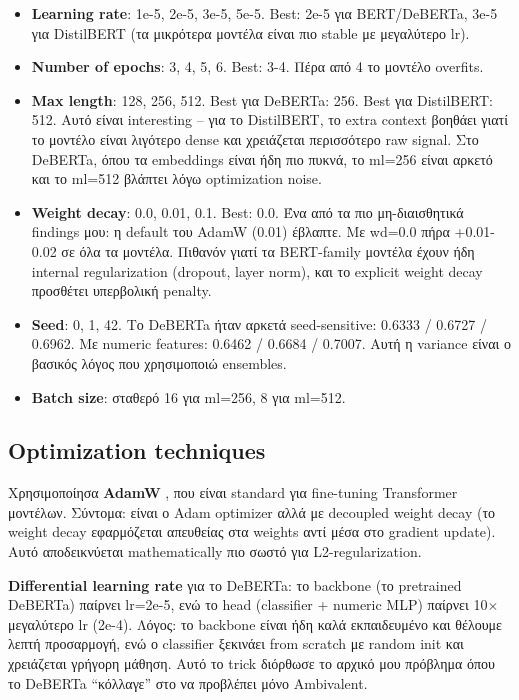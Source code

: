 \documentclass[12pt]{fphw}
\begin{document}
\begin{itemize}
    \item \textbf{Learning rate}: 1e-5, 2e-5, 3e-5, 5e-5. Best: 2e-5 για BERT/DeBERTa, 3e-5 για DistilBERT (τα μικρότερα μοντέλα είναι πιο stable με μεγαλύτερο lr).
    \item \textbf{Number of epochs}: 3, 4, 5, 6. Best: 3-4. Πέρα από 4 το μοντέλο overfits.
    \item \textbf{Max length}: 128, 256, 512. Best για DeBERTa: 256. Best για DistilBERT: 512. Αυτό είναι interesting -- για το DistilBERT, το extra context βοηθάει γιατί το μοντέλο είναι λιγότερο dense και χρειάζεται περισσότερο raw signal. Στο DeBERTa, όπου τα embeddings είναι ήδη πιο πυκνά, το ml=256 είναι αρκετό και το ml=512 βλάπτει λόγω optimization noise.
    \item \textbf{Weight decay}: 0.0, 0.01, 0.1. Best: 0.0. Ένα από τα πιο μη-διαισθητικά findings μου: η default του AdamW (0.01) έβλαπτε. Με wd=0.0 πήρα +0.01-0.02 σε όλα τα μοντέλα. Πιθανόν γιατί τα BERT-family μοντέλα έχουν ήδη internal regularization (dropout, layer norm), και το explicit weight decay προσθέτει υπερβολική penalty.
    \item \textbf{Seed}: 0, 1, 42. Το DeBERTa ήταν αρκετά seed-sensitive: 0.6333 / 0.6727 / 0.6962. Με numeric features: 0.6462 / 0.6684 / 0.7007. Αυτή η variance είναι ο βασικός λόγος που χρησιμοποιώ ensembles.
    \item \textbf{Batch size}: σταθερό 16 για ml=256, 8 για ml=512.
\end{itemize}

\subsection{Optimization techniques}

Χρησιμοποίησα \textbf{AdamW} \cite{loshchilov2019adamw}, που είναι standard για fine-tuning Transformer μοντέλων. Σύντομα: είναι ο Adam optimizer αλλά με decoupled weight decay (το weight decay εφαρμόζεται απευθείας στα weights αντί μέσα στο gradient update). Αυτό αποδεικνύεται mathematically πιο σωστό για L2-regularization.

\textbf{Differential learning rate} για το DeBERTa: το backbone (το pretrained DeBERTa) παίρνει lr=2e-5, ενώ το head (classifier + numeric MLP) παίρνει 10$\times$ μεγαλύτερο lr (2e-4). Λόγος: το backbone είναι ήδη καλά εκπαιδευμένο και θέλουμε λεπτή προσαρμογή, ενώ ο classifier ξεκινάει from scratch με random init και χρειάζεται γρήγορη μάθηση. Αυτό το trick διόρθωσε το αρχικό μου πρόβλημα όπου το DeBERTa ``κόλλαγε'' στο να προβλέπει μόνο Ambivalent.
\end{document}
